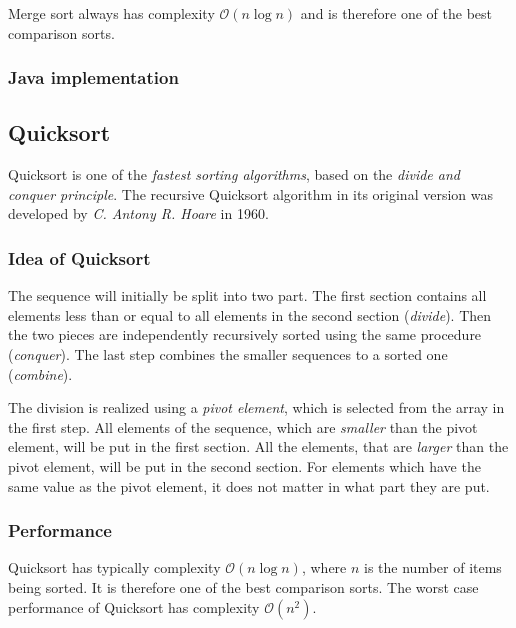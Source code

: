 \documentclass[nobranding]{pfBook}
\newcommand{\OO}{\mathcal{O}}
\begin{document}
	Merge sort always has complexity $\OO(n \log n)$ and is therefore one of the best comparison sorts.
	
	\subsubsection{Java implementation}
	
	
	
	\subsection{Quicksort}
	
	Quicksort is one of the \emph{fastest sorting algorithms}, based on the \emph{divide and conquer principle}. The recursive Quicksort algorithm in its original version was developed by \emph{C. Antony R. Hoare} in 1960.
	
	\subsubsection{Idea of Quicksort}
	
	The sequence will initially be split into two part. The first section contains all elements less than or equal to all elements in the second section (\emph{divide}). Then the two pieces are independently recursively sorted using the same procedure (\emph{conquer}). The last step combines the smaller sequences to a sorted one (\emph{combine}).
	
	The division is realized using a \emph{pivot element}, which is selected from the array in the first step. All elements of the sequence, which are \emph{smaller} than the pivot element, will be put in the first section. All the elements, that are \emph{larger} than the pivot element, will be put in the second section. For elements which have the same value as the pivot element, it does not matter in what part they are put.
	
	\subsubsection{Performance}
	
	Quicksort has typically complexity $\OO(n \log n)$, where $n$ is the number of items being sorted. It is therefore one of the best comparison sorts. The worst case performance of Quicksort has complexity $\OO(n^2)$.
	
\end{document}
